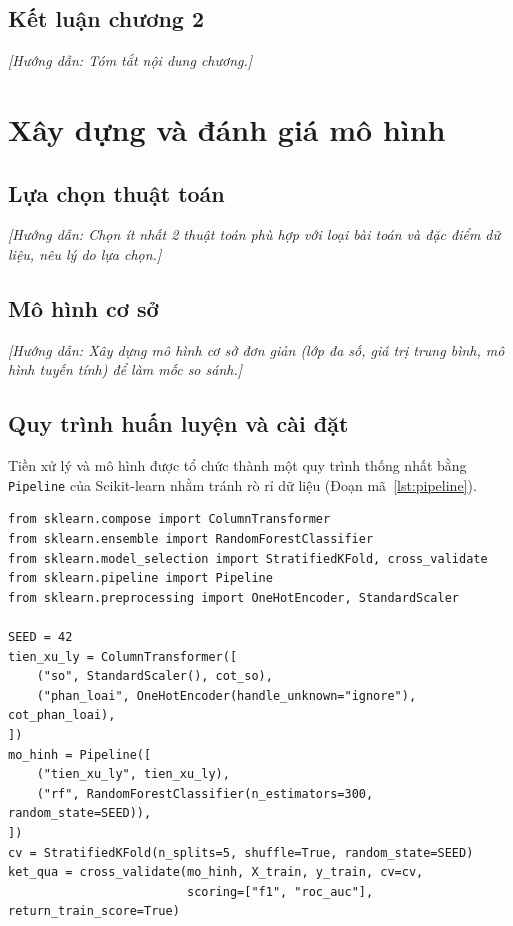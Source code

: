 \documentclass[12pt,a4paper,oneside]{report}
\newcommand{\huongdan}[1]{{\color{guide}\itshape [Hướng dẫn: #1]}}
\begin{document}
\section{Kết luận chương 2}
\huongdan{Tóm tắt nội dung chương.}

\chapter{Xây dựng và đánh giá mô hình}
\label{chap:mohinh}

\section{Lựa chọn thuật toán}
\huongdan{Chọn ít nhất 2 thuật toán phù hợp với loại bài toán và đặc điểm
dữ liệu, nêu lý do lựa chọn.}

\section{Mô hình cơ sở}
\huongdan{Xây dựng mô hình cơ sở đơn giản (lớp đa số, giá trị trung bình,
mô hình tuyến tính) để làm mốc so sánh.}

\section{Quy trình huấn luyện và cài đặt}
Tiền xử lý và mô hình được tổ chức thành một quy trình thống nhất bằng
\texttt{Pipeline} của Scikit-learn \cite{pedregosa2011} nhằm tránh rò rỉ dữ
liệu (Đoạn mã~\ref{lst:pipeline}).

\begin{lstlisting}[caption={Xây dựng Pipeline và kiểm định chéo},label={lst:pipeline}]
from sklearn.compose import ColumnTransformer
from sklearn.ensemble import RandomForestClassifier
from sklearn.model_selection import StratifiedKFold, cross_validate
from sklearn.pipeline import Pipeline
from sklearn.preprocessing import OneHotEncoder, StandardScaler

SEED = 42
tien_xu_ly = ColumnTransformer([
    ("so", StandardScaler(), cot_so),
    ("phan_loai", OneHotEncoder(handle_unknown="ignore"), cot_phan_loai),
])
mo_hinh = Pipeline([
    ("tien_xu_ly", tien_xu_ly),
    ("rf", RandomForestClassifier(n_estimators=300, random_state=SEED)),
])
cv = StratifiedKFold(n_splits=5, shuffle=True, random_state=SEED)
ket_qua = cross_validate(mo_hinh, X_train, y_train, cv=cv,
                         scoring=["f1", "roc_auc"], return_train_score=True)
\end{lstlisting}
\end{document}
